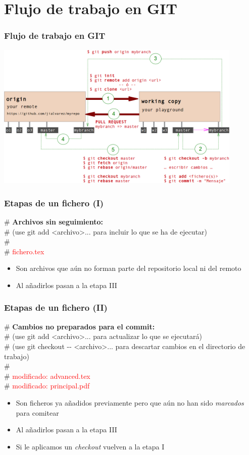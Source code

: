 \section{Flujo de trabajo en GIT}
\frame
{
\frametitle{Flujo de trabajo en GIT}
\begin{center}
 \includegraphics[height=7cm]{imgs/gitworkflow.png}
\end{center}
}

\frame
{
\frametitle{Etapas de un fichero (I)}
\begin{framed}
\# \textbf{Archivos sin seguimiento:}\\
\#   (use git add <archivo>... para incluir lo que se ha de ejecutar)\\
\#\\
\#	\textcolor{red}{fichero.tex}
\end{framed}

\begin{itemize}
 \item Son archivos que aún no forman parte del repositorio local ni del remoto
 \item Al añadirlos pasan a la etapa III
\end{itemize}
}

\frame
{
\frametitle{Etapas de un fichero (II)}
\begin{framed}
\# \textbf{Cambios no preparados para el commit:}\\
\#   (use git add <archivo>... para actualizar lo que se ejecutará)\\
\#   (use git checkout -{}- <archivo>... para descartar cambios en el directorio de trabajo)\\
\#\\
\#	\textcolor{red}{modificado:   advanced.tex}\\
\#	\textcolor{red}{modificado:   principal.pdf}\\
\end{framed}

\begin{itemize}
 \item Son ficheros ya añadidos previamente pero que aún no han sido \textit{marcados} para comitear
 \item Al añadirlos pasan a la etapa III
 \item Si le aplicamos un \textit{checkout} vuelven a la etapa I
\end{itemize}
}

